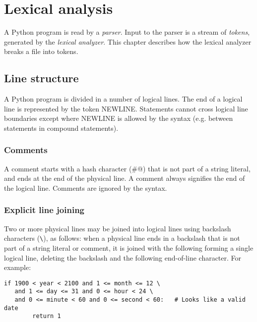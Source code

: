 \chapter{Lexical analysis}

A Python program is read by a {\em parser}.  Input to the parser is a
stream of {\em tokens}, generated by the {\em lexical analyzer}.  This
chapter describes how the lexical analyzer breaks a file into tokens.

\section{Line structure}

A Python program is divided in a number of logical lines.  The end of
a logical line is represented by the token NEWLINE.  Statements cannot
cross logical line boundaries except where NEWLINE is allowed by the
syntax (e.g. between statements in compound statements).

\subsection{Comments}

A comment starts with a hash character (\verb@#@) that is not part of
a string literal, and ends at the end of the physical line.  A comment
always signifies the end of the logical line.  Comments are ignored by
the syntax.

\subsection{Explicit line joining}

Two or more physical lines may be joined into logical lines using
backslash characters (\verb/\/), as follows: when a physical line ends
in a backslash that is not part of a string literal or comment, it is
joined with the following forming a single logical line, deleting the
backslash and the following end-of-line character.  For example:
%
\begin{verbatim}
if 1900 < year < 2100 and 1 <= month <= 12 \
   and 1 <= day <= 31 and 0 <= hour < 24 \
   and 0 <= minute < 60 and 0 <= second < 60:   # Looks like a valid date
        return 1
\end{verbatim}

